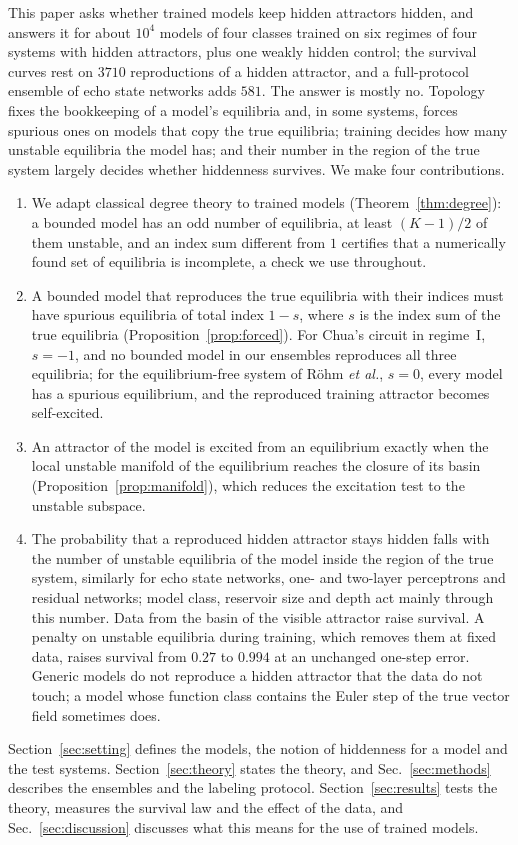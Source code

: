 This paper asks whether trained models keep hidden attractors hidden, and answers it for about $10^4$ models of four
classes trained on six regimes of four systems with hidden attractors, plus one weakly hidden control; the survival curves
rest on $3710$ reproductions of a hidden attractor, and a full-protocol ensemble of echo state networks adds $581$. The answer is mostly
no. Topology fixes the bookkeeping of a model's
equilibria and, in some systems, forces spurious ones on models that copy the true equilibria; training decides how many unstable equilibria the model has; and
their number in the region of the true system largely decides whether hiddenness survives. We make four contributions.
\begin{enumerate}
\item We adapt classical degree theory to trained models (Theorem~\ref{thm:degree}): a bounded model has an odd number of
equilibria, at least $(K-1)/2$ of them unstable, and an index sum different from $1$ certifies that a numerically found set
of equilibria is incomplete, a check we use throughout.
\item A bounded model that reproduces the true equilibria with their indices must have spurious equilibria of total index
$1-s$, where $s$ is the index sum of the true equilibria (Proposition~\ref{prop:forced}). For Chua's circuit in regime~I,
$s=-1$, and no bounded model in our ensembles reproduces all three equilibria; for the equilibrium-free system of R\"ohm
\textit{et al.},\cite{Rohm2021} $s=0$, every model has a spurious equilibrium, and the reproduced training attractor becomes
self-excited.
\item An attractor of the model is excited from an equilibrium exactly when the local unstable manifold of the equilibrium
reaches the closure of its basin (Proposition~\ref{prop:manifold}), which reduces the excitation test to the unstable
subspace.
\item The probability that a reproduced hidden attractor stays hidden falls with the number of unstable equilibria of the
model inside the region of the true system, similarly for echo state networks, one- and two-layer perceptrons and residual
networks; model class, reservoir size and depth act mainly through this number. Data from the basin of the visible
attractor raise survival. A penalty on unstable equilibria during training, which removes
them at fixed data, raises survival from $0.27$ to $0.994$ at an unchanged one-step error. Generic models do not reproduce a
hidden attractor that the data do not touch; a model whose function class contains the Euler step of the true vector
field sometimes does.
\end{enumerate}

Section~\ref{sec:setting} defines the models, the notion of hiddenness for a model and the test systems.
Section~\ref{sec:theory} states the theory, and Sec.~\ref{sec:methods} describes the ensembles and the labeling protocol.
Section~\ref{sec:results} tests the theory, measures the survival law and the effect of the data, and
Sec.~\ref{sec:discussion} discusses what this means for the use of trained models.
